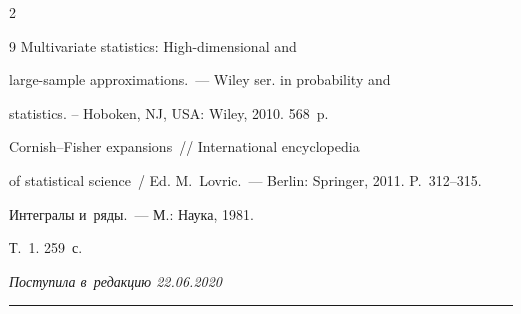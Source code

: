 \begin{multicols}{2}
{{\begin{thebibliography}{9}
 Multivariate statistics: High-dimensional and 


large-sample approximations.~--- Wiley ser. in probability and 


statistics. -- Hoboken, NJ, USA: Wiley, 2010. 568~p.







 Cornish--Fisher expansions~// International encyclopedia 


of statistical science~/ Ed. M.~Lovric.~--- Berlin: Springer, 2011. P.~312--315.







 Интегралы и~ряды.~--- М.: Наука, 1981. 


Т.~1. 259~с.


 \end{thebibliography}





}


}





\end{multicols}





\vspace*{-3pt}





\hfill{\small\textit{Поступила в~редакцию 22.06.2020}}





\vspace*{8pt}




















\hrule





